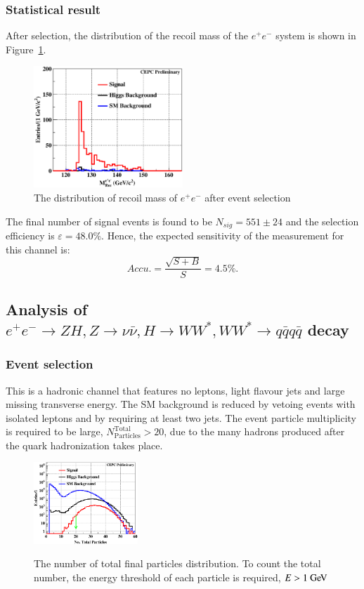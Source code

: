 \documentclass[11pt,a4paper]{cepcnote}
\begin{document}
\subsubsection{Statistical result}
After selection, the distribution of the recoil mass of the $e^+e^-$ system is shown in Figure~\ref{fig:eehuvqqrecfit}.
\begin{figure}[H]
\centering
\includegraphics[width=0.5\textwidth]{e1e1H/uvqq/fit_RecMass}
\caption[]{The distribution of recoil mass of $e^+e^-$ after event selection}
\label{fig:eehuvqqrecfit}
\end{figure}

The final number of signal events is found to be $N_{sig} = 551\pm24$
and the selection efficiency is $\varepsilon = 48.0\%$. 
Hence, the expected sensitivity of the measurement for this channel is:
\begin{equation*}
Accu.=\frac{\sqrt{S+B}}{S} = 4.5\%.
\end{equation*}

\subsection{Analysis of $e^+e^-\rightarrow ZH, Z\rightarrow \nu\bar{\nu}, H\rightarrow WW^*, WW^*\rightarrow q\bar{q}q\bar{q}$ decay}
\subsubsection{Event selection}
This is a hadronic channel that features no leptons, light flavour jets
and large missing transverse energy. The SM background is
reduced by vetoing events with isolated leptons and by requiring at
least two jets. The event particle multiplicity is required to be large,
$N_{\mathrm{Particles}}^{\mathrm{Total}} > 20$, due to the many hadrons produced
after the quark hadronization takes place.
\begin{figure}[H]
	\centering
	\includegraphics[width= 0.35\textwidth]{nnH/fourq/TotPart}
	\label{fig:nnH4qTotPart}
	\caption[]{The number of total final particles distribution. To count the total number, the energy threshold of each particle 
	is required, $E > 1\gev$}
\end{figure}
\end{document}
